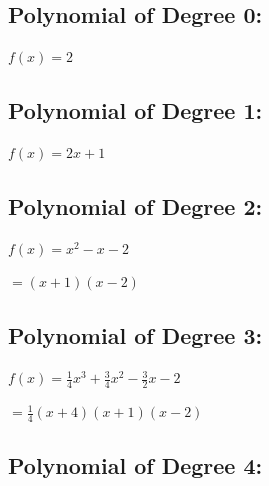 \subsection{Polynomial of Degree 0:}
\label{sss:poly-2a4f}

$
f(x) = 2
$

\subsection{Polynomial of Degree 1:}
\label{sss:poly-39b4}

$
f(x) = 2x + 1
$

\subsection{Polynomial of Degree 2:}
\label{sss:poly-bf2f}

$
f(x) = x^2 - x - 2
$

$
= (x + 1)(x - 2)
$

\subsection{Polynomial of Degree 3:}
\label{sss:poly-bd32}

$
f(x) = \frac{1}{4}x^3 + \frac{3}{4}x^2 - \frac{3}{2}x - 2
$

$
= \frac{1}{4} (x + 4)(x + 1)(x - 2)
$

\subsection{Polynomial of Degree 4:}
\label{sss:poly-93ac}

